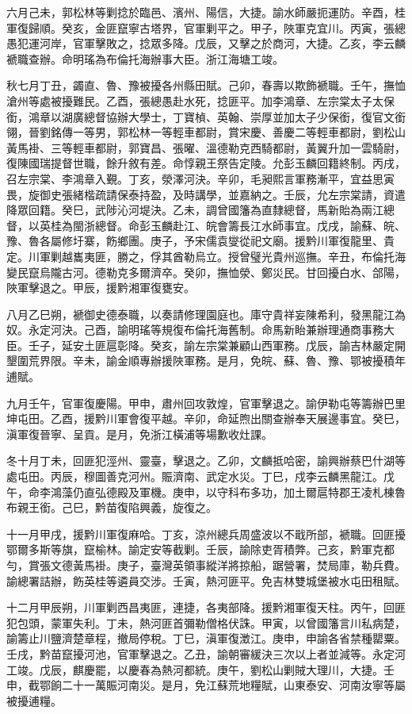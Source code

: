 \begin{pinyinscope}
六月己未，郭松林等剿捻於臨邑、濱州、陽信，大捷。諭水師嚴扼運防。辛酉，桂軍復歸順。癸亥，金匪竄寧古塔界，官軍剿平之。甲子，陜軍克宜川。丙寅，張總愚犯運河岸，官軍擊敗之，捻眾多降。戊辰，又擊之於商河，大捷。乙亥，李云麟褫職查辦。命明瑤為布倫托海辦事大臣。浙江海塘工竣。

秋七月丁丑，蠲直、魯、豫被擾各州縣田賦。己卯，春壽以欺飾褫職。壬午，撫恤滄州等處被擾難民。乙酉，張總愚赴水死，捻匪平。加李鴻章、左宗棠太子太保銜，鴻章以湖廣總督協辦大學士，丁寶楨、英翰、崇厚並加太子少保銜，復官文銜翎，晉劉銘傳一等男，郭松林一等輕車都尉，賞宋慶、善慶二等輕車都尉，劉松山黃馬褂、三等輕車都尉，郭寶昌、張曜、溫德勒克西騎都尉，黃翼升加一雲騎尉，復陳國瑞提督世職，餘升敘有差。命惇親王祭告定陵。允彭玉麟回籍終制。丙戌，召左宗棠、李鴻章入覲。丁亥，滎澤河決。辛卯，毛昶熙言軍務漸平，宜益思寅畏，旋御史張緒楷疏請保泰持盈，及時講學，並嘉納之。壬辰，允左宗棠請，資遣降眾回籍。癸巳，武陟沁河堤決。乙未，調曾國籓為直隸總督，馬新貽為兩江總督，以英桂為閩浙總督。命彭玉麟赴江、皖會籌長江水師事宜。戊戌，諭蘇、皖、豫、魯各屬修圩寨，飭鄉團。庚子，予宋儒袁燮從祀文廟。援黔川軍復龍里、貴定。川軍剿越巂夷匪，勝之，俘其酋勒烏立。授曾璧光貴州巡撫。辛丑，布倫托海變民竄烏隴古河。德勒克多爾濟卒。癸卯，撫恤滎、鄭災民。甘回擾白水、郃陽，陜軍擊退之。甲辰，援黔湘軍復甕安。

八月乙巳朔，褫御史德泰職，以奏請修理園庭也。庫守貴祥妄陳希利，發黑龍江為奴。永定河決。己酉，諭明瑤等規復布倫托海舊制。命馬新眙兼辦理通商事務大臣。壬子，延安土匪扈彰降。癸亥，諭左宗棠兼顧山西軍務。戊辰，諭吉林嚴定開墾圍荒界限。辛未，諭金順專辦援陜軍務。是月，免皖、蘇、魯、豫、鄂被擾積年逋賦。

九月壬午，官軍復慶陽。甲申，肅州回攻敦煌，官軍擊退之。諭伊勒屯等籌辦巴里坤屯田。乙酉，援黔川軍會復平越。辛卯，命延煦出關查辦奉天展邊事宜。癸巳，滇軍復晉寧、呈貢。是月，免浙江橫浦等場歉收灶課。

冬十月丁未，回匪犯涇州、靈臺，擊退之。乙卯，文麟抵哈密，諭興辦蔡巴什湖等處屯田。丙辰，穆圖善克河州。賑濟南、武定水災。丁巳，戍李云麟黑龍江。戊午，命李鴻藻仍直弘德殿及軍機。庚申，以守科布多功，加土爾扈特郡王凌札棟魯布親王銜。己巳，黔苗復陷興義，旋復之。

十一月甲戌，援黔川軍復麻哈。丁亥，涼州總兵周盛波以不戢所部，褫職。回匪擾鄂爾多斯等旗，竄榆林。諭定安等截剿。壬辰，諭除吏胥積弊。己亥，黔軍克都勻，賞張文德黃馬褂。庚子，臺灣英領事縱洋將掠船，踞營署，焚局庫，勒兵費。諭總署詰辦，飭英桂等遴員交涉。壬寅，熱河匪平。免吉林雙城堡被水屯田租賦。

十二月甲辰朔，川軍剿西昌夷匪，連捷，各夷部降。援黔湘軍復天柱。丙午，回匪犯包頭，蒙軍失利。丁未，熱河匪首彌勒僧格伏誅。甲寅，以曾國籓言川私病楚，諭籌止川鹽濟楚章程，撤局停稅。丁巳，滇軍復澂江。庚申，申諭各省禁種罌粟。壬戌，黔苗竄擾河池，官軍擊退之。乙丑，諭朝審緩決三次以上者並減等。永定河工竣。戊辰，麒慶罷，以慶春為熱河都統。庚午，劉松山剿賊大理川，大捷。壬申，截鄂餉二十一萬賑河南災。是月，免江蘇荒地糧賦，山東泰安、河南汝寧等屬被擾逋糧。


\end{pinyinscope}
